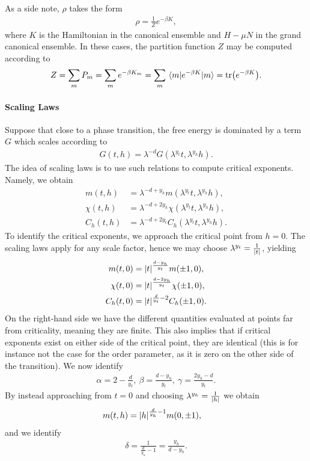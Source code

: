 As a side note, $\rho$ takes the form
\begin{align*}
	\rho = \frac{1}{Z}e^{-\beta K},
\end{align*}
where $K$ is the Hamiltonian in the canonical ensemble and $H - \mu N$ in the grand canonical ensemble. In these cases, the partition function $Z$ may be computed according to
\begin{align*}
	Z = \sum\limits_{m}P_{m} = \sum\limits_{m}e^{-\beta K_{m}} = \sum\limits_{m}\mel{m}{e^{-\beta K}}{m} = \tr(e^{-\beta K}).
\end{align*}

\paragraph{Scaling Laws}
Suppose that close to a phase transition, the free energy is dominated by a term $G$ which scales according to
\begin{align*}
	G(t, h) = \lambda^{-d}G(\lambda^{y_{t}}t, \lambda^{y_{h}}h).
\end{align*}
The idea of scaling laws is to use such relations to compute critical exponents. Namely, we obtain
\begin{align*}
	m(t, h)     &= \lambda^{-d + y_{h}}m(\lambda^{y_{t}}t, \lambda^{y_{h}}h), \\
	\chi(t, h)  &= \lambda^{-d + 2y_{h}}\chi(\lambda^{y_{t}}t, \lambda^{y_{h}}h), \\
	C_{h}(t, h) &= \lambda^{-d + 2y_{t}}C_{h}(\lambda^{y_{t}}t, \lambda^{y_{h}}h).
\end{align*}
To identify the critical exponents, we approach the critical point from $h = 0$. The scaling laws apply for any scale factor, hence we may choose $\lambda^{y_{t}} = \frac{1}{\abs{t}}$, yielding
\begin{align*}
	m(t, 0)     &= \abs{t}^{\frac{d - y_{h}}{y_{t}}}m(\pm 1, 0), \\
	\chi(t, 0)  &= \abs{t}^{\frac{d - 2y_{h}}{y_{t}}}\chi(\pm 1, 0), \\
	C_{h}(t, 0) &= \abs{t}^{\frac{d}{y_{t}} - 2}C_{h}(\pm 1, 0).
\end{align*}
On the right-hand side we have the different quantities evaluated at points far from criticality, meaning they are finite. This also implies that if critical exponents exist on either side of the critical point, they are identical (this is for instance not the case for the order parameter, as it is zero on the other side of the transition). We now identify
\begin{align*}
	\alpha = 2 - \frac{d}{y_{t}},\ \beta = \frac{d - y_{h}}{y_{t}},\ \gamma = \frac{2y_{h} - d}{y_{t}}.
\end{align*}
By instead approaching from $t = 0$ and choosing $\lambda^{y_{h}} = \frac{1}{\abs{h}}$ we obtain
\begin{align*}
	m(t, h) &= \abs{h}^{\frac{d}{y_{h}} - 1}m(0, \pm 1),
\end{align*}
and we identify
\begin{align*}
	\delta= \frac{1}{\frac{d}{y_{h}} - 1} = \frac{y_{h}}{d - y_{h}}.
\end{align*}

